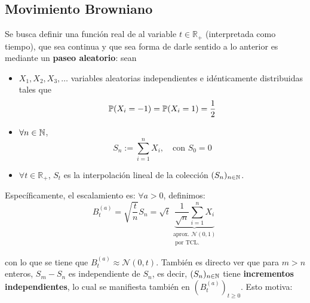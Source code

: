 % 

\subsection{Movimiento Browniano}



Se busca definir una función real de al variable $t \in \mathbb{R}_{+}$ (interpretada como tiempo), que sea continua y que sea \textit{} forma de darle sentido a lo anterior es mediante un \textbf{paseo aleatorio}:
sean 
\begin{itemize}
\item $X_1, X_2, X_3, \ldots $ variables aleatorias independientes e idénticamente distribuidas tales que 
    \begin{equation*}
            \P(X_{i} = -1) = \P(X_i = 1) = \frac{1}{2}
    \end{equation*}
 \item $\forall  n \in \N$,
     \begin{equation*}
             S_n := \sum_{i=1}^{n} X_i, ~ ~ ~ \text{ con } S_0 = 0
     \end{equation*}
 \item $\forall t\in \mathbb{R}_{+}$, $S_t$ es la interpolación lineal de la colección $(S_{n})_{n \in \N}$.
\end{itemize}


Específicamente, el escalamiento es: $\forall a >0$, definimos:
\begin{equation*}
    B_t^{(a)} = \sqrt{\frac{t}{n}}   S_n = \sqrt{t}
    \underbrace{\frac{1}{\sqrt{n} } \sum_{i=1}^{n} X_i}_{\substack{\text{aprox. } \mathcal{N}(0,1) \\ \text{ por TCL.}}}
\end{equation*}

con lo que se tiene que $B_t^{(a)} \approx \mathcal{N}(0,t)$. También es directo ver que para $m > n$ enteros,
$S_m - S_n$ es independiente de $S_n$, es decir, $(S_n)_{n \in \N}$ tiene \textbf{incrementos independientes},
lo cual se manifiesta también en $(B_{t}^{(a)})_{t \geq 0}$. Esto motiva:

